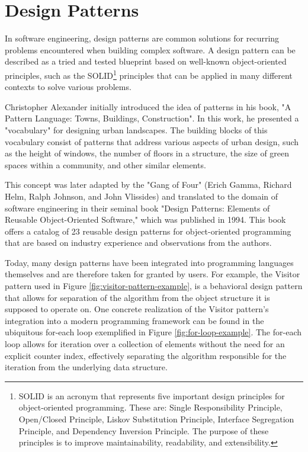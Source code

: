 \section{Design Patterns}
    In software engineering, design patterns are common solutions for recurring problems encountered when building complex software. A design pattern can be described as a tried and tested blueprint based on well-known object-oriented principles, such as the SOLID\footnote{SOLID is an acronym that represents five important design principles for object-oriented programming. These are: Single Responsibility Principle, Open/Closed Principle, Liskov Substitution Principle, Interface Segregation Principle, and Dependency Inversion Principle. The purpose of these principles is to improve maintainability, readability, and extensibility.} principles that can be applied in many different contexts to solve various problems.

    Christopher Alexander initially introduced the idea of patterns in his book, "A Pattern Language: Towns, Buildings, Construction"\cite{alexander1977pattern}. In this work, he presented a "vocabulary" for designing urban landscapes. The building blocks of this vocabulary consist of patterns that address various aspects of urban design, such as the height of windows, the number of floors in a structure, the size of green spaces within a community, and other similar elements.

    This concept was later adapted by the "Gang of Four" (Erich Gamma, Richard Helm, Ralph Johnson, and John Vlissides) and translated to the domain of software engineering in their seminal book "Design Patterns: Elements of Reusable Object-Oriented Software," which was published in 1994\cite{gamma1994design}. This book offers a catalog of 23 reusable design patterns for object-oriented programming that are based on industry experience and observations from the authors.

    Today, many design patterns have been integrated into programming languages themselves and are therefore taken for granted by users. For example, the Visitor pattern used in Figure \ref{fig:visitor-pattern-example}, is a behavioral design pattern that allows for separation of the algorithm from the object structure it is supposed to operate on. One concrete realization of the Visitor pattern's integration into a modern programming framework can be found in the ubiquitous for-each loop exemplified in Figure \ref{fig:for-loop-example}. The for-each loop allows for iteration over a collection of elements without the need for an explicit counter index, effectively separating the algorithm responsible for the iteration from the underlying data structure.


